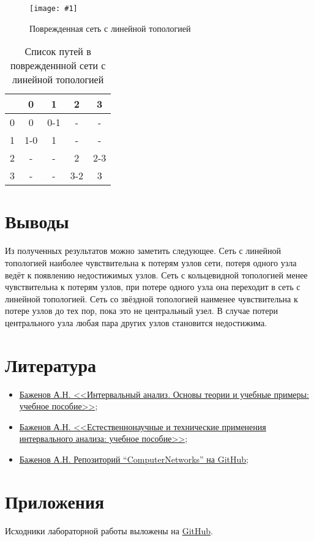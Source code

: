 \documentclass[a4paper,12pt]{article}
\newcommand{\plot}[3]{
  \begin{figure}[H]
    \begin{center}
      \texttt{[image: \#1]}
      \caption{#2}
      \label{#3}
    \end{center}
  \end{figure}
}
\begin{document}
\plot{./images/TopologyLine_corrupted.png}{Поврежденная сеть с линейной
топологией}{p:tl_c}

\begin{table}[H]
  \caption{Список путей в поврежденнной сети с линейной топологией}
  \begin{tabular}{| c | c | c | c | c |}
    \hline
             & 0 & 1 & 2 & 3 \\
             \hline
    0 & 0 & 0-1 & - & - \\
    \hline
    1 & 1-0 & 1 & - & - \\
    \hline
    2 & - & - & 2 & 2-3 \\
    \hline
    3 & - & - & 3-2 & 3 \\
    \hline
  \end{tabular}
  \centering
\end{table}

\section{Выводы}
\quad Из полученных результатов можно заметить следующее. Сеть с линейной
топологией наиболее чувствительна к потерям узлов сети, потеря одного узла ведёт
к появлению недостижимых узлов. Сеть с кольцевидной топологией менее
чувствительна к потерям узлов, при потере одного узла она переходит в сеть с
линейной топологией. Сеть со звёздной топологией наименее чувствительна к потере
узлов до тех пор, пока это не центральный узел. В случае потери центрального
узла любая пара других узлов становится недостижима.

\section{Литература}
\begin{itemize}
  \item \href{https://elib.spbstu.ru/dl/2/s20-76.pdf/info}{Баженов А.Н.
    <<Интервальный анализ. Основы теории и учебные примеры: учебное пособие>>};
  \item \href{https://elib.spbstu.ru/dl/5/tr/2021/tr21-169.pdf/info}{Баженов
      А.Н. <<Естественнонаучные и технические применения интервального анализа:
    учебное пособие>>};
  \item \href{https://github.com/AlexanderBazhenov/ComputerNetworks}{Баженов
    А.Н. Репозиторий ``ComputerNetworks'' на GitHub};
\end{itemize}

\section{Приложения}
\quad Исходники лабораторной работы выложены на
\href{https://github.com/MeShootIn/computer-networks/tree/lab-2}{GitHub}.
\end{document}
